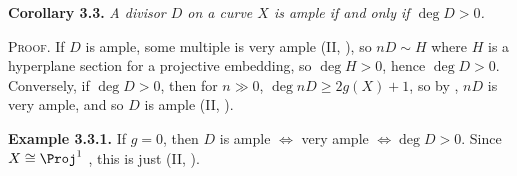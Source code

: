 {\medskip
\noindent\hypertarget{result-IV-3.3}{}\textbf{Corollary 3.3.} \emph{A divisor $D$ on a curve $X$ is ample if and only if $\deg D>0$.}

\smallskip
\noindent\textsc{Proof.} If $D$ is ample, some multiple is very ample (II, ), so $nD\sim H$ where $H$ is a hyperplane section for a projective embedding, so $\deg H>0$, hence $\deg D>0$. Conversely, if $\deg D>0$, then for $n\gg0$, $\deg nD\geq2g(X)+1$, so by , $nD$ is very ample, and so $D$ is ample (II, ).

\medskip
\noindent\hypertarget{result-IV-3.3.1}{}\textbf{Example 3.3.1.} If $g=0$, then $D$ is ample $\Leftrightarrow$ very ample $\Leftrightarrow\deg D>0$. Since $X\cong\Proj^1$ , this is just (II, ).
}
